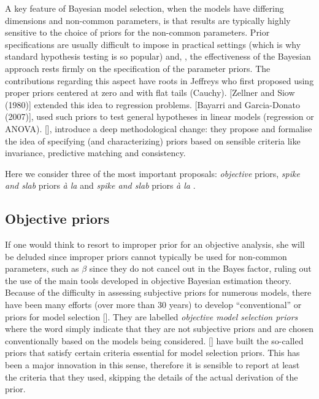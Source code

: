 \documentclass[11 pt]{article}
\begin{document}
\begin{multicols}{2}
A key feature of Bayesian model selection, when the models have differing dimensions and non-common parameters, is that results are typically highly sensitive to the choice of priors for the non-common parameters. Prior specifications are usually difficult to impose in practical settings (which is why standard hypothesis testing is so popular) and, , the effectiveness of the Bayesian approach rests firmly on the specification of the parameter priors. The contributions regarding this aspect have roots in Jeffreys who first proposed using proper priors centered at zero and with flat tails (Cauchy). [Zellner and Siow (1980)] extended this idea to regression problems. [Bayarri and Garcia-Donato (2007)], used such priors to test general hypotheses in linear models (regression or ANOVA). [\cite{Bayarri2012}], introduce a deep methodological change: they propose and formalise the idea of specifying (and characterizing) priors based on sensible criteria like invariance, predictive matching and consistency.

Here we consider three of the most important proposals: \textit{objective} priors, \textit{spike and slab} priors \textit{à la} \cite{George1993} and \textit{spike and slab} priors \textit{à la} \cite{Ish2005}.

\subsection{Objective priors}
If one would think to resort to improper prior for an objective analysis, she will be deluded since improper priors cannot typically be used for non-common parameters, such as $\beta$ since they do not cancel out in the Bayes factor, ruling out the use of the main tools developed in objective Bayesian estimation theory. Because of the difficulty in assessing subjective priors for numerous models, there have been many efforts (over more than 30 years) to develop “conventional” or  priors for model selection [\cite{Bayarri2012}]. They are labelled \textit{objective model selection priors} where the word  simply indicate that they are not subjective priors and are chosen conventionally based on the models being considered. 
[\cite{Bayarri2012}] have built the so-called  priors that satisfy certain criteria essential for model selection priors. This has been a major innovation in this sense, therefore it is sensible to report at least the criteria that they used, skipping the details of the actual derivation of the prior. 


\end{multicols}
\end{document}
